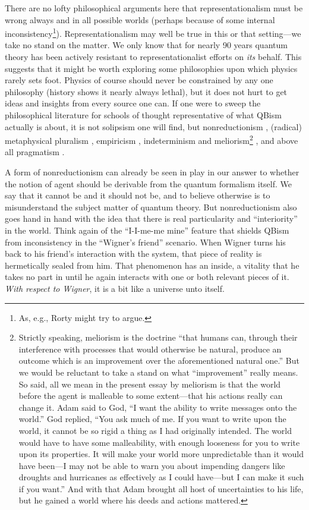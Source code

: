 \documentclass[aps,pra,superscriptaddress,12pt,tightenlines,nofootinbib]{revtex4-2}
\begin{document}
There are no lofty philosophical arguments here that re\-presentationalism must be wrong always and in all possible worlds (perhaps because of some internal inconsistency\footnote{As, e.g., Rorty \cite{Rorty91} might try to argue.}).  Representationalism may well be true in this or that setting---we take no stand on the matter.  We only know that for nearly 90 years quantum theory has been actively resistant to representationalist efforts on {\it its\/} behalf.  This suggests that it might be worth exploring some philosophies upon which physics rarely sets foot.  Physics of course should never be constrained by any one philosophy (history shows it nearly always lethal), but it does not hurt to get ideas and insights from every source one can.  If one were to sweep the philosophical literature for schools of thought representative of what QBism actually is about, it is not solipsism one will find, but nonreductionism \cite{Dupre93,Cartwright99}, (radical) metaphysical pluralism \cite{James96a,Wahl25}, empiricism \cite{James40,James96b}, indeterminism and meliorism\footnote{Strictly speaking, meliorism is the doctrine ``that humans can, through their interference with processes that would otherwise be natural, produce an outcome which is an improvement over the aforementioned natural one.''  But we would be reluctant to take a stand on what ``improvement'' really means.  So said, all we mean in the present essay by meliorism is that the world before the agent is malleable to some extent---that his actions really can change it.  Adam said to God, ``I want the ability to write messages onto the world.''  God replied, ``You ask much of me.  If you want to write upon the world, it cannot be so rigid a thing as I had originally intended.  The world would have to have some malleability, with enough looseness for you to write upon its properties.  It will make your world more unpredictable than it would have been---I may not be able to warn you about impending dangers like droughts and hurricanes as effectively as I could have---but I can make it such if you want.'' And with that Adam brought all host of uncertainties to his life, but he gained a world where his deeds and actions mattered.} \cite{James1884}, and above all pragmatism \cite{Menand01,Thayer81}.

A form of nonreductionism can already be seen in play in our answer to whether the notion of agent should be derivable from the quantum formalism itself.  We say that it cannot be and it should not be, and to believe otherwise is to misunderstand the subject matter of quantum theory.  But nonreductionism also goes hand in hand with the idea that there is real particularity and ``interiority'' in the world.  Think again of the ``I-I-me-me mine'' feature that shields QBism from inconsistency in the ``Wigner's friend'' scenario.
When Wigner turns his back to his friend's interaction with the system, that piece of reality is hermetically sealed from him.  That phenomenon has an inside, a vitality that he takes no part in until he again interacts with one or both relevant pieces of it.  {\it With respect to Wigner}, it is a bit like a universe unto itself.
\end{document}
